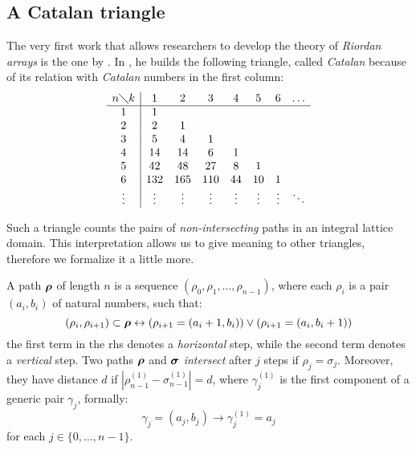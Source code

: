 
\subsection{A Catalan triangle}

The very first work that allows researchers to develop the theory of
\emph{Riordan arrays} is the one by \citeauthor{shapiro:1976}. 
In \cite{shapiro:1976}, he builds the following triangle, called
\emph{Catalan} because of its relation with \emph{Catalan} numbers in the first
column:
\begin{equation}
    \begin{array}{c|ccccccc}
        n\diagdown k & 1 & 2 & 3 & 4 & 5 & 6&\ldots\\
        \hline
        1&1 & & & & & &\\
        2&2 &1 & & & & &\\
        3&5 &4 &1 & & & &\\
        4&14 &14 &6 &1 & & &\\
        5&42 &48 &27 &8 &1 & &\\
        6&132 &165 &110 &44 &10 &1& \\
        \vdots&\vdots&\vdots&\vdots&\vdots&\vdots&\vdots&\ddots \\
    \end{array}
    \label{eq:shapiro:catalan:triangle:expanded}
\end{equation}

Such a triangle counts the pairs of \emph{non-intersecting} paths  in an
integral lattice domain. This interpretation allows us to give meaning to other
triangles, therefore we formalize it a little more.

A path $\boldsymbol{\rho}$ of length $n$ is a sequence $(\rho_{0},\rho_{1},\ldots,\rho_{n-1})$,
where each $\rho_{i}$ is a pair $(a_{i},b_{i})$ of natural numbers, such that:
\begin{displaymath}
    (\rho_{i},\rho_{i+1})\subset\boldsymbol{\rho} \leftrightarrow
    (\rho_{i+1}=(a_{i}+1,b_{i})) \vee 
    (\rho_{i+1}=(a_{i},b_{i}+1)) 
\end{displaymath}
the first term in the \ac{rhs} denotes a \emph{horizontal} step, while the second
term denotes a \emph{vertical} step. Two paths $\boldsymbol{\rho}$ and
$\boldsymbol{\sigma}$ \emph{intersect} after $j$ steps if $\rho_{j}=\sigma_{j}$.
Moreover, they have distance $d$ if
$\left|\rho_{n-1}^{(1)}-\sigma_{n-1}^{(1)}\right|=d$, where $\gamma_{j}^{(1)}$
is the first component of a generic pair $\gamma_{j}$, formally:
\begin{displaymath}
    \gamma_{j}=(a_{j},b_{j}) \rightarrow \gamma_{j}^{(1)}=a_{j}
\end{displaymath}
for each $j\in\lbrace0,\ldots,n-1\rbrace$.

